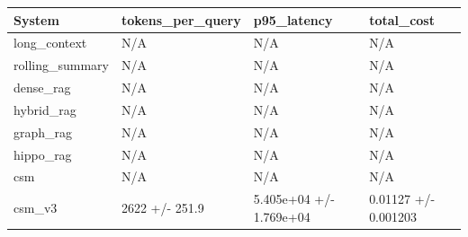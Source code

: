 \begin{tabular}{llll}
System & tokens_per_query & p95_latency & total_cost \\
\hline
long\_context & N/A & N/A & N/A \\
rolling\_summary & N/A & N/A & N/A \\
dense\_rag & N/A & N/A & N/A \\
hybrid\_rag & N/A & N/A & N/A \\
graph\_rag & N/A & N/A & N/A \\
hippo\_rag & N/A & N/A & N/A \\
csm & N/A & N/A & N/A \\
csm\_v3 & 2622 +/- 251.9 & 5.405e+04 +/- 1.769e+04 & 0.01127 +/- 0.001203 \\
\end{tabular}
